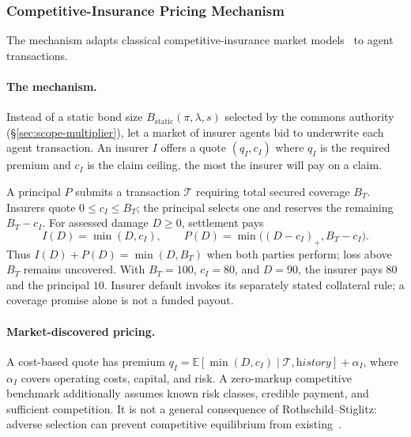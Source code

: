 \documentclass[11pt,a4paper]{article}
\theoremstyle{definition}
\theoremstyle{remark}
\begin{document}
\subsubsection{Competitive-Insurance Pricing Mechanism}\label{sec:youle}
The mechanism adapts classical competitive-insurance market
models~ to agent transactions.

\paragraph{The mechanism.}\label{sec:youle:mechanism}
Instead of a static bond size $B_{\mathrm{static}}(\pi, \lambda, s)$ selected by the commons authority (\S\ref{sec:scope-multiplier}), let a market of insurer agents bid to underwrite each agent transaction. An insurer $I$ offers a quote $(q_I, c_I)$ where $q_I$ is the required premium and $c_I$ is the claim ceiling, the most the insurer will pay on a claim.

A principal $P$ submits a transaction $\mathcal{T}$ requiring total secured coverage
$B_T$. Insurers quote $0\le c_I\le B_T$; the principal selects one and
reserves the remaining $B_T-c_I$. For assessed damage $D\ge0$, settlement pays
\[
 I(D)=\min(D,c_I),\qquad
 P(D)=\min\bigl((D-c_I)_+,B_T-c_I\bigr).
\]
Thus $I(D)+P(D)=\min(D,B_T)$ when both parties perform; loss above $B_T$
remains uncovered. With $B_T=100$, $c_I=80$, and $D=90$, the insurer pays
$80$ and the principal $10$. Insurer default invokes its separately stated
collateral rule; a coverage promise alone is not a funded payout.

\paragraph{Market-discovered pricing.}
A cost-based quote has premium
$q_I=\mathbb E[\min(D,c_I)\mid \mathcal{T},\textit{history}]+\alpha_I$,
where $\alpha_I$ covers operating costs, capital, and risk. A zero-markup
competitive benchmark additionally assumes known risk classes, credible
payment, and sufficient competition. It is not a general consequence of
Rothschild--Stiglitz: adverse selection can prevent competitive equilibrium
from existing~.
\end{document}

